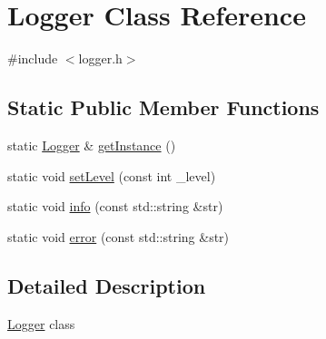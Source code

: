 \hypertarget{class_logger}{\section{Logger Class Reference}
\label{class_logger}
}


{\ttfamily \#include $<$logger.\-h$>$}

\subsection*{Static Public Member Functions}
\begin{DoxyCompactItemize}
\item 
static \hyperlink{class_logger}{Logger} \& \hyperlink{class_logger_afbe890cea4f5034d431905a8578f9f22}{get\-Instance} ()
\item 
static void \hyperlink{class_logger_a05c08d63c998943daa2d367d7f249b71}{set\-Level} (const int \-\_\-level)
\item 
static void \hyperlink{class_logger_a8c3241624b6c53ed73c1b56c2ab11980}{info} (const std\-::string \&str)
\item 
static void \hyperlink{class_logger_a3a3e9991bb8edfdaea583a70f2d439b9}{error} (const std\-::string \&str)
\end{DoxyCompactItemize}


\subsection{Detailed Description}
\hyperlink{class_logger}{Logger} class 

